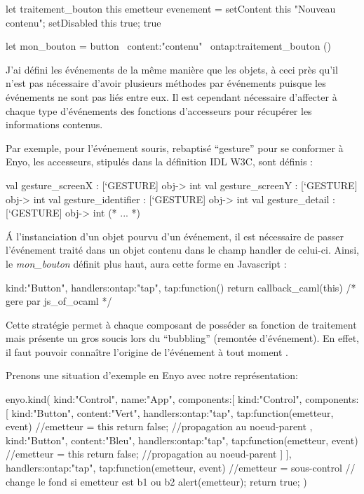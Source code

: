 \documentclass[11pt,a4paper]{report}
\begin{document}
\begin{OCaml}
let traitement_bouton this emetteur evenement = 
   setContent this "Nouveau contenu";
   setDisabled this true;
   true

let mon_bouton = button ~content:"contenu" ~ontap:traitement_bouton ()
\end{OCaml}

J'ai défini les événements de la même manière que les objets, à ceci près qu'il n'est pas nécessaire 
d'avoir plusieurs méthodes par événements puisque les événements ne sont pas liés entre eux. Il 
est cependant nécessaire d'affecter à chaque type d'événements des fonctions d'accesseurs pour 
récupérer les informations contenus.

Par exemple, pour l'événement souris, rebaptisé ``gesture'' pour se conformer à Enyo, les accesseurs,
stipulés dans la définition IDL W3C, sont définis :

\begin{OCaml}
  val gesture_screenX : [`GESTURE] obj-> int
  val gesture_screenY : [`GESTURE] obj-> int
  val gesture_identifier : [`GESTURE] obj-> int
  val gesture_detail : [`GESTURE] obj-> int
  (* ... *)
\end{OCaml}
\medskip

\'A l'instanciation d'un objet pourvu d'un événement, il est nécessaire de passer l'événement traité
dans un objet contenu dans le champ handler de celui-ci. Ainsi, le \emph{mon\_bouton} définit plus haut,
aura cette forme en Javascript :

\begin{JavaScript}
  {kind:"Button", handlers:{ontap:"tap"}, 
    tap:function(){ return callback_caml(this) /* gere par js_of_ocaml */ }}
\end{JavaScript}

Cette stratégie permet à chaque composant de posséder sa fonction de traitement mais présente 
un gros soucis lors du ``bubbling'' (remontée d'événement). En effet, il faut pouvoir connaître l'origine
de l'événement à tout moment .

Prenons une situation d'exemple en Enyo avec notre représentation:
\begin{JavaScript}
enyo.kind({
    kind:"Control",
    name:"App",
    components:[
      {
        kind:"Control",
        components:[
          {kind:"Button", content:"Vert",         
            handlers:{ontap:"tap"},
            tap:function(emetteur, event){
              //emetteur = this 
              return false; //propagation au noeud-parent
            }
          },
          {kind:"Button", content:"Bleu",         
            handlers:{ontap:"tap"},
            tap:function(emetteur, event){
              //emetteur = this
              return false; //propagation au noeud-parent
            }
          }
        ]
        }
      ],
    handlers:{ontap:"tap"},
    tap:function(emetteur, event){
      //emetteur = sous-control
      // change le fond si emetteur est b1 ou b2 
      alert(emetteur);
      return true;
    }
})
\end{JavaScript}
\end{document}
